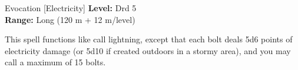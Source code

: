 {Evocation [Electricity]}
{
	\textbf{Level:}
	Drd 5\\
	\textbf{Range:}
	Long (120 m + 12 m/level)\\
}
{
	This spell functions like call lightning, except that each bolt deals 5d6 points of electricity damage (or 5d10 if created outdoors in a stormy area), and you may call a maximum of 15 bolts.

}
